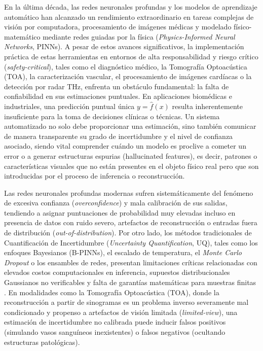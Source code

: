
\label{sec:introduccion}

En la última década, las redes neuronales profundas y los modelos de aprendizaje automático han alcanzado un rendimiento extraordinario en tareas complejas de visión por computadora, procesamiento de imágenes médicas y modelado físico-matemático mediante redes guiadas por la física (\textit{Physics-Informed Neural Networks}, PINNs). A pesar de estos avances significativos, la implementación práctica de estas herramientas en entornos de alta responsabilidad y riesgo crítico (\textit{safety-critical}), tales como el diagnóstico médico, la Tomografía Optoacústica (TOA), la caracterización vascular, el procesamiento de imágenes cardíacas o la detección por radar THz, enfrenta un obstáculo fundamental: la falta de confiabilidad en sus estimaciones puntuales. En aplicaciones biomédicas e industriales, una predicción puntual única $y = \hat{f}(x)$ resulta inherentemente insuficiente para la toma de decisiones clínicas o técnicas. Un sistema automatizado no solo debe proporcionar una estimación, sino también comunicar de manera transparente su grado de incertidumbre y el nivel de confianza asociado, siendo vital comprender cuándo un modelo es proclive a cometer un error o a generar estructuras espurias (hallucinated features), es decir, patrones o características visuales que no están presentes en el objeto físico real pero que son introducidas por el proceso de inferencia o reconstrucción.

Las redes neuronales profundas modernas sufren sistemáticamente del fenómeno de excesiva confianza (\textit{overconfidence}) y mala calibración de sus salidas, tendiendo a asignar puntuaciones de probabilidad muy elevadas incluso en presencia de datos con ruido severo, artefactos de reconstrucción o entradas fuera de distribución (\textit{out-of-distribution}). Por otro lado, los métodos tradicionales de Cuantificación de Incertidumbre (\textit{Uncertainty Quantification}, UQ), tales como los enfoques Bayesianos (B-PINNs), el escalado de temperatura, el \textit{Monte Carlo Dropout} o los ensambles de redes, presentan limitaciones críticas relacionadas con elevados costos computacionales en inferencia, supuestos distribucionales Gaussianos no verificables y falta de garantías matemáticas para muestras finitas \cite{Yifan2025}. En modalidades como la Tomografía Optoacústica (TOA), donde la reconstrucción a partir de sinogramas es un problema inverso severamente mal condicionado y propenso a artefactos de visión limitada (\textit{limited-view}), una estimación de incertidumbre no calibrada puede inducir falsos positivos (simulando vasos sanguíneos inexistentes) o falsos negativos (ocultando estructuras patológicas).

